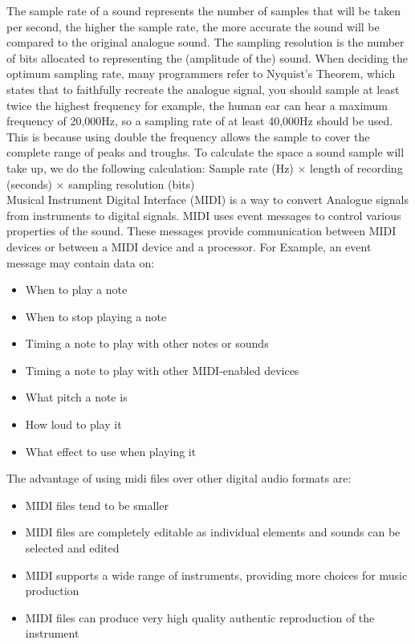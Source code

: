  The sample rate of a sound represents the number of samples that will be taken per second, the higher the sample rate, the more accurate the sound will be compared to the original analogue sound. The sampling resolution is the number of bits allocated to representing the (amplitude of the) sound. When deciding the optimum sampling rate, many programmers refer to Nyquist's Theorem, which states that to faithfully recreate the analogue signal, you should sample at least twice the highest frequency for example, the human ear can hear a maximum frequency of 20,000Hz, so a sampling rate of at least 40,000Hz should be used. This is because using double the frequency allows the sample to cover the complete range of peaks and troughs. To calculate the space a sound sample will take up, we do the following calculation: Sample rate (Hz) $\times$ length of recording (seconds) $\times$ sampling resolution (bits)\\
  Musical Instrument Digital Interface (MIDI) is a way to convert Analogue signals from instruments to digital signals. MIDI uses event messages to control various properties of the sound. These messages provide communication between MIDI devices or between a MIDI device and a processor. For Example, an event message may contain data on:
  \begin{itemize}
    \setlength{\itemsep}{0em}
    \item When to play a note
    \item When to stop playing a note
    \item Timing a note to play with other notes or sounds
    \item Timing a note to play with other MIDI-enabled devices
    \item What pitch a note is
    \item How loud to play it
    \item What effect to use when playing it
  \end{itemize}
  The advantage of using midi files over other digital audio formats are:
  \begin{itemize}
    \setlength{\itemsep}{0em}
    \item MIDI files tend to be smaller
    \item MIDI files are completely editable as individual elements and sounds can be selected and edited
    \item MIDI supports a wide range of instruments, providing more choices for music production
    \item MIDI files can produce very high quality authentic reproduction of the instrument
  \end{itemize}
